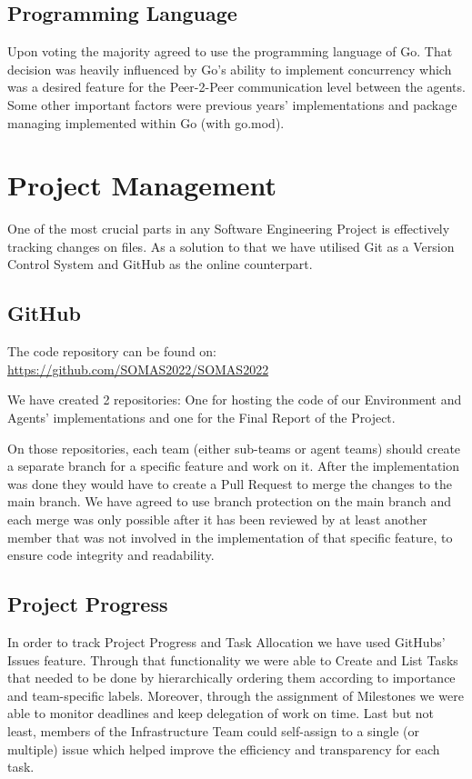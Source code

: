 \subsection{Programming Language}

Upon voting the majority agreed to use the programming language of Go. That decision was heavily influenced by Go's ability to implement concurrency which was a desired feature for the Peer-2-Peer communication level between the agents. Some other important factors were previous years' implementations and package managing implemented within Go (with go.mod).

\newpage

\section{Project Management}

One of the most crucial parts in any Software Engineering Project is effectively tracking changes on files. As a solution to that we have utilised Git as a Version Control System and GitHub as the online counterpart.

\subsection{GitHub}

The code repository can be found on: \url{https://github.com/SOMAS2022/SOMAS2022}

We have created 2 repositories: One for hosting the code of our Environment and Agents' implementations and one for the Final Report of the Project.

On those repositories, each team (either sub-teams or agent teams) should create a separate branch for a specific feature and work on it. After the implementation was done they would have to create a Pull Request to merge the changes to the main branch. We have agreed to use branch protection on the main branch and each merge was only possible after it has been reviewed by at least another member that was not involved in the implementation of that specific feature, to ensure code integrity and readability.

\subsection{Project Progress}

In order to track Project Progress and Task Allocation we have used GitHubs' Issues feature. 
Through that functionality we were able to Create and List Tasks that needed to be done by hierarchically ordering them according to importance and team-specific labels.
Moreover, through the assignment of Milestones we were able to monitor deadlines and keep delegation of work on time.
Last but not least, members of the Infrastructure Team could self-assign to a single (or multiple) issue which helped improve the efficiency and transparency for each task.

